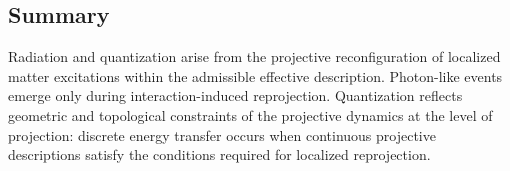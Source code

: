 \subsection{Summary}
  \label{subsec:summary-radiation-quantization}

  Radiation and quantization arise from the projective reconfiguration of
  localized matter excitations within the admissible effective description.
  Photon-like events emerge only during interaction-induced reprojection.
  Quantization reflects geometric and topological constraints of the
  projective dynamics at the level of projection: discrete energy transfer
  occurs when continuous projective descriptions satisfy the conditions
  required for localized reprojection.
